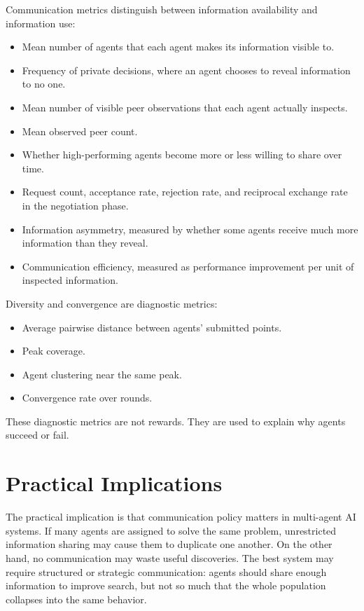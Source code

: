 \documentclass[11pt]{article}
\begin{document}
Communication metrics distinguish between information availability and information use:

\begin{itemize}[leftmargin=0.3in]
\item Mean number of agents that each agent makes its information visible to.
\item Frequency of private decisions, where an agent chooses to reveal information to no one.
\item Mean number of visible peer observations that each agent actually inspects.
\item Mean observed peer count.
\item Whether high-performing agents become more or less willing to share over time.
\item Request count, acceptance rate, rejection rate, and reciprocal exchange rate in the negotiation phase.
\item Information asymmetry, measured by whether some agents receive much more information than they reveal.
\item Communication efficiency, measured as performance improvement per unit of inspected information.
\end{itemize}

Diversity and convergence are diagnostic metrics:

\begin{itemize}[leftmargin=0.3in]
\item Average pairwise distance between agents' submitted points.
\item Peak coverage.
\item Agent clustering near the same peak.
\item Convergence rate over rounds.
\end{itemize}

These diagnostic metrics are not rewards. They are used to explain why agents succeed or fail.

\section{Practical Implications}

The practical implication is that communication policy matters in multi-agent AI systems. If many agents are assigned to solve the same problem, unrestricted information sharing may cause them to duplicate one another. On the other hand, no communication may waste useful discoveries. The best system may require structured or strategic communication: agents should share enough information to improve search, but not so much that the whole population collapses into the same behavior.
\end{document}
